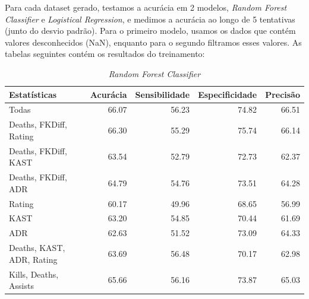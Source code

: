 \documentclass[12pt]{article}
\begin{document}
Para cada dataset gerado, testamos a acurácia em 2 modelos, \textit{Random Forest Classifier} e \textit{Logistical Regression}, e medimos a acurácia ao longo de 5 tentativas (junto do desvio padrão). Para o primeiro modelo, usamos os dados que contém valores desconhecidos (NaN), enquanto para o segundo filtramos esses valores. As tabelas seguintes contém os resultados do treinamento:

\begin{table}[!h]
  \begin{center}
    \caption{\textit{Random Forest Classifier}}
    \begin{tabular}{l|rrrr}
      \toprule
      Estatísticas & Acurácia & Sensibilidade & Especificidade & Precisão \\ \midrule
      Todas                     & 66.07 & 56.23 & 74.82 & {\color{Green} 66.51} \\
      \midrule
      Deaths, FKDiff, Rating    & {\color{Green} 66.30} & 55.29 & {\color{Green} 75.74} & 66.14 \\
      Deaths, FKDiff, KAST      & 63.54 & 52.79 & 72.73 & 62.37 \\
      Deaths, FKDiff, ADR       & 64.79 & 54.76 & 73.51 & 64.28 \\
      \midrule
      Rating                    & {\color{Red} 60.17} & {\color{Red} 49.96} & {\color{Red} 68.65} & {\color{Red} 56.99} \\
      KAST                      & 63.20 & 54.85 & 70.44 & 61.69 \\
      ADR                       & 62.63 & 51.52 & 73.09 & 64.33 \\
      \midrule
      Deaths, KAST, ADR, Rating & 63.69 & {\color{Green} 56.48} & 70.17 & 62.98 \\
      Kills, Deaths, Assists    & 65.66 & 56.16 & 73.87 & 65.03 \\
      \bottomrule
    \end{tabular}
  \end{center}
\end{table}
\end{document}
